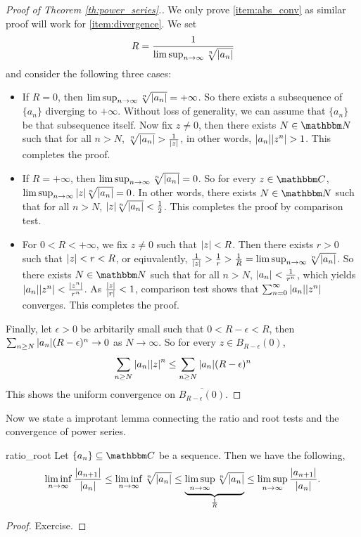 \documentclass[../ComplexAnalysis_Notes.tex]{subfiles}
\begin{document}
\begin{proof}[Proof of Theorem \ref{th:power_series}.]
  We only prove \ref{item:abs_conv} as similar proof will work for \ref{item:divergence}. We set \[ R = \frac{1}{\limsup_{n \to \infty} \sqrt[n]{\abs{a_n}}} \]
  and consider the following three cases:
  \begin{itemize}
    \item If \(R = 0\), then \(\limsup_{n \to \infty} \sqrt[n]{\abs{a_n}} = +\infty\). So there exists a subsequence of \(\{a_{n}\}\) diverging to \(+\infty\). Without loss of generality, we can assume that \(\{a_{n}\}\) be that subsequence itself. Now fix \(z \neq 0\), then there exists \(N \in \N\) such that for all \(n > N\), \(\sqrt[n]{\abs{a_n}} > \frac{1}{\abs{z}}\), in other words, \(\abs{a_n}\abs{z^n} > 1\). This completes the proof.
    \item If \(R = +\infty\), then \(\limsup_{n \to \infty} \sqrt[n]{\abs{a_n}} = 0\). So for every \(z \in \C\), \(\limsup_{n \to \infty} \abs{z}\sqrt[n]{\abs{a_n}} = 0\). In other words, there exists \(N \in \N\) such that for all \(n > N\), \(\abs{z}\sqrt[n]{\abs{a_n}} < \frac 12\). This completes the proof by comparison test.
    \item For \(0 < R < +\infty\), we fix \(z \neq 0\) such that \(\abs{z} < R\). Then there exists \(r > 0\) such that \(\abs{z} < r < R\), or eqiuvalently, \(\frac 1{\abs{z}} > \frac 1r > \frac 1R = \limsup_{n \to \infty} \sqrt[n]{\abs{a_n}}\). So there exists \(N \in \N\) such that for all \(n > N\), \(\abs{a_n} < \frac 1{r^n}\), which yields \(\abs{a_n}\abs{z^n} < \frac{\abs{z^n}}{r^n}\). As \(\frac{\abs{z}}{\abs{r}} < 1\), comparison test shows that \(\sum_{n = 0}^{\infty} \abs{a_n}\abs{z^n}\) converges. This completes the proof.
  \end{itemize}

  Finally, let \(\epsilon > 0\) be arbitarily small such that \(0 < R - \epsilon < R\), then \(\sum_{n \geq N} \abs{a_n}(R - \epsilon)^n \to 0\) as \(N \to \infty\). So for every \(z \in B_{R-\epsilon}(0)\), \[ \sum_{n \geq N} \abs{a_n}\abs{z}^n \leq \sum_{n \geq N} \abs{a_n}(R - \epsilon)^n \]
  This shows the uniform convergence on \(\overline{B_{R - \epsilon}(0)}\).
\end{proof}

Now we state a improtant lemma connecting the ratio and root tests and the convergence of power series.

\begin{Lem}{}{ratio_root}
  Let \(\{a_n\} \subseteq \C\) be a sequence. Then we have the following,
  \[
    \liminf_{n \to \infty} \frac{\abs{a_{n+1}}}{\abs{a_n}} \leq \liminf_{n \to \infty} \sqrt[n]{\abs{a_n}} \leq \underbrace{\limsup_{n \to \infty} \sqrt[n]{\abs{a_n}}}_{\frac 1R} \leq \limsup_{n \to \infty} \frac{\abs{a_{n+1}}}{\abs{a_n}}.
  \]
\end{Lem}
\begin{proof}
  Exercise.
\end{proof}
\end{document}
